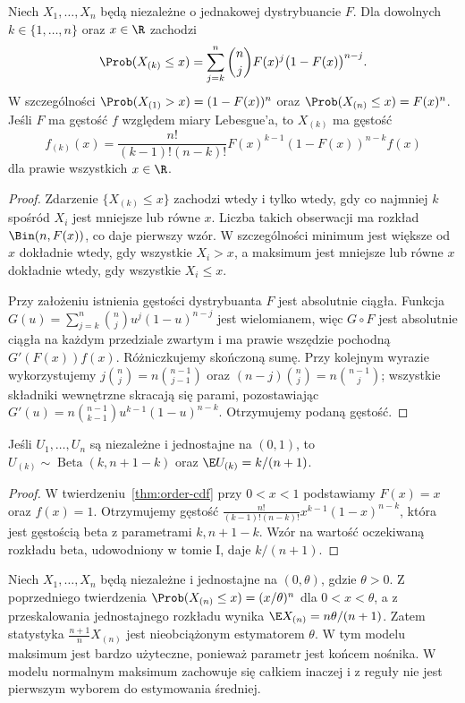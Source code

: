 \begin{twierdzenie}\label{thm:order-cdf}
Niech $X_1,\ldots,X_n$ będą niezależne o jednakowej dystrybuancie $F$. Dla dowolnych $k\in\{1,\ldots,n\}$ oraz $x\in\R$ zachodzi
\[
\Prob(X_{(k)}\le x)=\sum_{j=k}^n\binom nj F(x)^j\bigl(1-F(x)\bigr)^{n-j}.
\]
W szczególności $\Prob(X_{(1)}>x)=(1-F(x))^n$ oraz $\Prob(X_{(n)}\le x)=F(x)^n$. Jeśli $F$ ma gęstość $f$ względem miary Lebesgue'a, to $X_{(k)}$ ma gęstość
\[
f_{(k)}(x)=\frac{n!}{(k-1)!(n-k)!}F(x)^{k-1}(1-F(x))^{n-k}f(x)
\]
dla prawie wszystkich $x\in\R$.
\end{twierdzenie}
\begin{proof}
Zdarzenie $\{X_{(k)}\le x\}$ zachodzi wtedy i tylko wtedy, gdy co najmniej $k$ spośród $X_i$ jest mniejsze lub równe $x$. Liczba takich obserwacji ma rozkład $\Bin(n,F(x))$, co daje pierwszy wzór. W szczególności minimum jest większe od $x$ dokładnie wtedy, gdy wszystkie $X_i>x$, a maksimum jest mniejsze lub równe $x$ dokładnie wtedy, gdy wszystkie $X_i\le x$.

Przy założeniu istnienia gęstości dystrybuanta $F$ jest absolutnie ciągła. Funkcja $G(u)=\sum_{j=k}^n\binom nj u^j(1-u)^{n-j}$ jest wielomianem, więc $G\circ F$ jest absolutnie ciągła na każdym przedziale zwartym i ma prawie wszędzie pochodną $G'(F(x))f(x)$. Różniczkujemy skończoną sumę. Przy kolejnym wyrazie wykorzystujemy $j\binom nj=n\binom{n-1}{j-1}$ oraz $(n-j)\binom nj=n\binom{n-1}j$; wszystkie składniki wewnętrzne skracają się parami, pozostawiając
$G'(u)=n\binom{n-1}{k-1}u^{k-1}(1-u)^{n-k}$. Otrzymujemy podaną gęstość.
\end{proof}

\begin{wniosek}\label{cor:uniform-beta}
Jeśli $U_1,\ldots,U_n$ są niezależne i jednostajne na $(0,1)$, to $U_{(k)}\sim\operatorname{Beta}(k,n+1-k)$ oraz $\E U_{(k)}=k/(n+1)$.
\end{wniosek}
\begin{proof}
W twierdzeniu~\ref{thm:order-cdf} przy $0<x<1$ podstawiamy $F(x)=x$ oraz $f(x)=1$. Otrzymujemy gęstość $\frac{n!}{(k-1)!(n-k)!}x^{k-1}(1-x)^{n-k}$, która jest gęstością beta z parametrami $k,n+1-k$. Wzór na wartość oczekiwaną rozkładu beta, udowodniony w tomie I, daje $k/(n+1)$.
\end{proof}

\begin{przyklad}\label{ex:max-uniform}
Niech $X_1,\ldots,X_n$ będą niezależne i jednostajne na $(0,\theta)$, gdzie $\theta>0$. Z poprzedniego twierdzenia $\Prob(X_{(n)}\le x)=(x/\theta)^n$ dla $0<x<\theta$, a z przeskalowania jednostajnego rozkładu wynika $\E X_{(n)}=n\theta/(n+1)$. Zatem statystyka $\frac{n+1}{n}X_{(n)}$ jest nieobciążonym estymatorem $\theta$. W tym modelu maksimum jest bardzo użyteczne, ponieważ parametr jest końcem nośnika. W modelu normalnym maksimum zachowuje się całkiem inaczej i z reguły nie jest pierwszym wyborem do estymowania średniej.
\end{przyklad}

